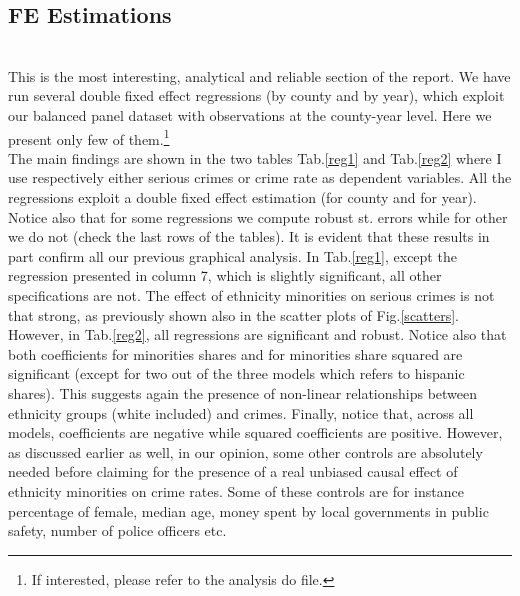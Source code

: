 \documentclass[a4paper,12pt]{article}
\begin{document}
\newpage
\subsection{FE Estimations}

\\This is the most interesting, analytical and reliable section of the report. We have run several double fixed effect regressions (by county and by year), which exploit our balanced panel dataset with observations at the county-year level. Here we present only few of them.\footnote{If interested, please refer to the analysis do file.}
\\The main findings are shown in the two tables Tab.\ref{reg1} and Tab.\ref{reg2} where I use respectively either serious crimes or crime rate as dependent variables. All the regressions exploit a double fixed effect estimation (for county and for year). Notice also that for some regressions we compute robust st. errors while for other we do not (check the last rows of the tables). It is evident that these results in part confirm all our previous graphical analysis. In Tab.\ref{reg1}, except the regression presented in column 7, which is slightly significant, all other specifications are not. The effect of ethnicity minorities on serious crimes is not that strong, as previously shown also in the scatter plots of Fig.\ref{scatters}. However, in Tab.\ref{reg2}, all regressions are significant and robust. Notice also that both coefficients for minorities shares and for minorities share squared are significant (except for two out of the three models which refers to hispanic shares). This suggests again the presence of non-linear relationships between ethnicity groups (white included) and crimes. Finally, notice that, across all models, coefficients are negative while squared coefficients are positive.
However, as discussed earlier as well, in our opinion, some other controls are absolutely needed before claiming for the presence of a real unbiased causal effect of ethnicity minorities on crime rates. Some of these controls are for instance percentage of female, median age, money spent by local governments in public safety, number of police officers etc.  
\end{document}
